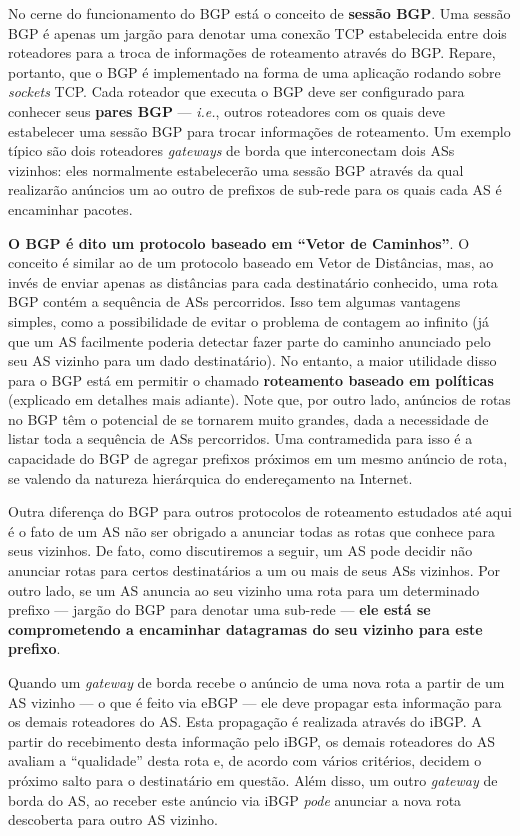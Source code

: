 \documentclass{article}
\begin{document}
No cerne do funcionamento do BGP está o conceito de \textbf{sessão BGP}. Uma sessão BGP é apenas um jargão para denotar uma conexão TCP estabelecida entre dois roteadores para a troca de informações de roteamento através do BGP. Repare, portanto, que o BGP é implementado na forma de uma aplicação rodando sobre \textit{sockets} TCP. Cada roteador que executa o BGP deve ser configurado para conhecer seus \textbf{pares BGP} --- \textit{i.e.}, outros roteadores com os quais deve estabelecer uma sessão BGP para trocar informações de roteamento. Um exemplo típico são dois roteadores \textit{gateways} de borda que interconectam dois ASs vizinhos: eles normalmente estabelecerão uma sessão BGP através da qual realizarão anúncios um ao outro de prefixos de sub-rede para os quais cada AS é encaminhar pacotes.

\textbf{O BGP é dito um protocolo baseado em ``Vetor de Caminhos''}. O conceito é similar ao de um protocolo baseado em Vetor de Distâncias, mas, ao invés de enviar apenas as distâncias para cada destinatário conhecido, uma rota BGP contém a sequência de ASs percorridos. Isso tem algumas vantagens simples, como a possibilidade de evitar o problema de contagem ao infinito (já que um AS facilmente poderia detectar fazer parte do caminho anunciado pelo seu AS vizinho para um dado destinatário). No entanto, a maior utilidade disso para o BGP está em permitir o chamado \textbf{roteamento baseado em políticas} (explicado em detalhes mais adiante). Note que, por outro lado, anúncios de rotas no BGP têm o potencial de se tornarem muito grandes, dada a necessidade de listar toda a sequência de ASs percorridos. Uma contramedida para isso é a capacidade do BGP de agregar prefixos próximos em um mesmo anúncio de rota, se valendo da natureza hierárquica do endereçamento na Internet.

Outra diferença do BGP para outros protocolos de roteamento estudados até aqui é o fato de um AS não ser obrigado a anunciar todas as rotas que conhece para seus vizinhos. De fato, como discutiremos a seguir, um AS pode decidir não anunciar rotas para certos destinatários a um ou mais de seus ASs vizinhos. Por outro lado, se um AS anuncia ao seu vizinho uma rota para um determinado prefixo --- jargão do BGP para denotar uma sub-rede --- \textbf{ele está se comprometendo a encaminhar datagramas do seu vizinho para este prefixo}.

Quando um \textit{gateway} de borda recebe o anúncio de uma nova rota a partir de um AS vizinho --- o que é feito via eBGP --- ele deve propagar esta informação para os demais roteadores do AS. Esta propagação é realizada através do iBGP. A partir do recebimento desta informação pelo iBGP, os demais roteadores do AS avaliam a ``qualidade'' desta rota e, de acordo com vários critérios, decidem o próximo salto para o destinatário em questão. Além disso, um outro \textit{gateway} de borda do AS, ao receber este anúncio via iBGP \textit{pode} anunciar a nova rota descoberta para outro AS vizinho.
\end{document}

